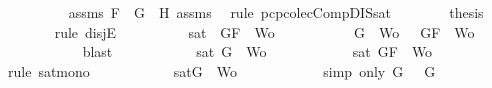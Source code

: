 \begin{isabellebody}
\ \ \ \ \ \ \ \ \isamarkupfalse%
\ assms{\isacharparenleft}{}{\isacharparenright}\ {\isacartoucheopen}F\ {\isacharequal}\ G{}\ \isactrlbold {\isasymrightarrow}\ H{}{\isacartoucheclose}\ assms{\isacharparenleft}{}{\isacharcomma}{}{\isacharcomma}{}{\isacharparenright}\ \isamarkupfalse%
\ {\isacharparenleft}rule\ pcp{\isacharunderscore}colecComp{\isacharunderscore}DIS{\isacharunderscore}sat{}{\isacharparenright}\isanewline
\ \ \ \ \ \ \isamarkupfalse%
\ {\isacharquery}thesis\isanewline
\ \ \ \ \ \ \isamarkupfalse%
\ {\isacharparenleft}rule\ disjE{\isacharparenright}\isanewline
\ \ \ \ \ \ \ \ \isamarkupfalse%
\ {\isachardoublequoteopen}sat\ {\isacharparenleft}{\isacharbraceleft}\isactrlbold {\isasymnot}\ G{}{\isacharcomma}F{\isacharbraceright}\ {\isasymunion}\ Wo{\isacharparenright}{\isachardoublequoteclose}\isanewline
\ \ \ \ \ \ \ \ \isamarkupfalse%
\ {\isachardoublequoteopen}{\isacharbraceleft}\isactrlbold {\isasymnot}\ G{}{\isacharbraceright}\ {\isasymunion}\ Wo\ {\isasymsubseteq}\ {\isacharbraceleft}\isactrlbold {\isasymnot}\ G{}{\isacharcomma}F{\isacharbraceright}\ {\isasymunion}\ Wo{\isachardoublequoteclose}\isanewline
\ \ \ \ \ \ \ \ \ \ \isamarkupfalse%
\ blast\isanewline
\ \ \ \ \ \ \ \ \isamarkupfalse%
\ \isamarkupfalse%
\ {\isachardoublequoteopen}sat{\isacharparenleft}{\isacharbraceleft}\isactrlbold {\isasymnot}\ G{}{\isacharbraceright}\ {\isasymunion}\ Wo{\isacharparenright}{\isachardoublequoteclose}\isanewline
\ \ \ \ \ \ \ \ \ \ \isamarkupfalse%
\ {\isacartoucheopen}sat{\isacharparenleft}{\isacharbraceleft}\isactrlbold {\isasymnot}\ G{}{\isacharcomma}F{\isacharbraceright}\ {\isasymunion}\ Wo{\isacharparenright}{\isacartoucheclose}\ \isamarkupfalse%
\ {\isacharparenleft}rule\ sat{\isacharunderscore}mono{\isacharparenright}\isanewline
\ \ \ \ \ \ \ \ \isamarkupfalse%
\ \isamarkupfalse%
\ {\isachardoublequoteopen}sat{\isacharparenleft}{\isacharbraceleft}G{\isacharbraceright}\ {\isasymunion}\ Wo{\isacharparenright}{\isachardoublequoteclose}\isanewline
\ \ \ \ \ \ \ \ \ \ \isamarkupfalse%
\ {\isacharparenleft}simp\ only{\isacharcolon}\ {\isacartoucheopen}G\ {\isacharequal}\ \isactrlbold {\isasymnot}\ G{}{\isacartoucheclose}{\isacharparenright}\isanewline
\ \ \ \ \ \ \ \ \isamarkupfalse%

\end{isabellebody}
